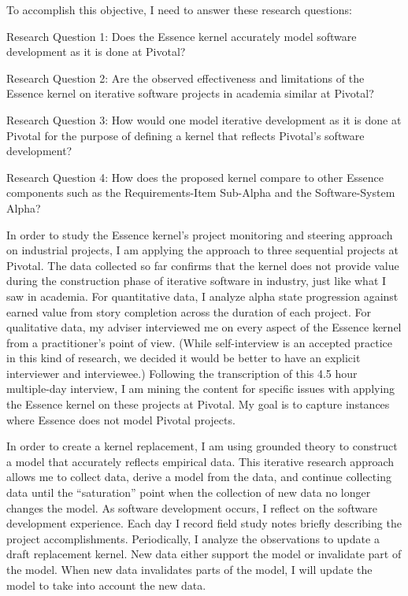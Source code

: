 \documentclass[preprint,12pt,3p]{elsarticle}
\begin{document}
To accomplish this objective, I need to answer these research questions:

Research Question 1: Does the Essence kernel accurately model software development as it is done at Pivotal? 

Research Question 2: Are the observed effectiveness and limitations of the Essence kernel on iterative software projects in academia similar at Pivotal? 

Research Question 3: How would one model iterative development as it is done at Pivotal for the purpose of defining a kernel that reflects Pivotal's software development?

Research Question 4: How does the proposed kernel compare to other Essence components such as the Requirements-Item Sub-Alpha and the Software-System Alpha? 

In order to study the Essence kernel's project monitoring and steering approach on industrial projects, I am applying the approach to three sequential projects at Pivotal. The data collected so far confirms that the kernel does not provide value during the construction phase of iterative software in industry, just like what I saw in academia. For quantitative data, I analyze alpha state progression against earned value from story completion across the duration of each project. For qualitative data, my adviser interviewed me on every aspect of the Essence kernel from a practitioner's point of view. (While self-interview is an accepted practice in this kind of research, we decided it would be better to have an explicit interviewer and interviewee.) Following the transcription of this 4.5 hour multiple-day interview, I am mining the content for specific issues with applying the Essence kernel on these projects at Pivotal. My goal is to capture instances where Essence does not model Pivotal projects. 

In order to create a kernel replacement, I am using grounded theory \cite{ConstructivistGroundedTheory} to construct a model that accurately reflects empirical data. This iterative research approach allows me to collect data, derive a model from the data, and continue collecting data until the ``saturation'' point when the collection of new data no longer changes the model. As software development occurs, I reflect on the software development experience. Each day I record field study notes briefly describing the project accomplishments. Periodically, I analyze the observations to update a draft replacement kernel. New data either support the model or invalidate part of the model. When new data invalidates parts of the model, I will update the model to take into account the new data.
\end{document}
